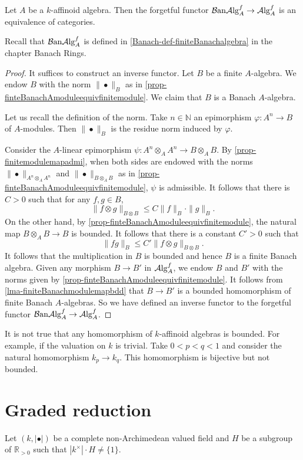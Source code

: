 \begin{proposition}
    Let $A$ be a $k$-affinoid algebra. Then the forgetful functor $\mathcal{B}\mathrm{an}\mathcal{A}\mathrm{lg}_A^f\rightarrow \mathcal{A}\mathrm{lg}_A^f$ is an equivalence of categories.
\end{proposition}
Recall that $\mathcal{B}\mathrm{an}\mathcal{A}\mathrm{lg}_A^f$ is defined in \cref{Banach-def-finiteBanachalgebra} in the chapter Banach Rings.
\begin{proof}
    It suffices to construct an inverse functor. Let $B$ be a finite $A$-algebra. 
    We endow $B$ with the norm $\|\bullet\|_B$ as in \cref{prop-finteBanachAmoduleequivfinitemodule}. We claim that $B$ is a Banach $A$-algebra.

    Let us recall the definition of the norm.
    Take $n\in \mathbb{N}$ an epimorphism $\varphi:A^n\rightarrow B$ of $A$-modules. Then $\|\bullet\|_B$ is the residue norm induced by $\varphi$.

    Consider the $A$-linear epimorphism $\psi:A^n\otimes_A A^n\rightarrow B\otimes_A B$. By \cref{prop-finitemodulemapadmi}, when both sides are endowed with the norms $\|\bullet\|_{A^n\otimes_A A^n}$ and $\|\bullet\|_{B\otimes_A B}$ as in \cref{prop-finteBanachAmoduleequivfinitemodule}, $\psi$ is admissible. It follows that there is $C>0$ such that for any $f,g\in B$,
    \[
        \|f\otimes g\|_{B\otimes B}\leq C\|f\|_B \cdot\|g\|_B.  
    \]
    On the other hand, by \cref{prop-finteBanachAmoduleequivfinitemodule}, the natural map $B\otimes_A B\rightarrow B$ is bounded. It follows that there is a constant $C'>0$ such that
    \[
        \|fg\|_B\leq C'\|f\otimes g\|_{B\otimes B}.
    \]
    It follows that the multiplication in $B$ is bounded and hence $B$ is a finite Banach algebra. Given any morphism $B\rightarrow B'$ in $\mathcal{A}\mathrm{lg}_A^f$, we endow $B$ and $B'$ with the norms given by \cref{prop-finteBanachAmoduleequivfinitemodule}. It follows from \cref{lma-finiteBanachmodulemapbdd} that $B\rightarrow B'$ is a bounded homomorphism of finite Banach $A$-algebras. So we have defined an inverse functor to the forgetful functor $\mathcal{B}\mathrm{an}\mathcal{A}\mathrm{lg}_A^f\rightarrow \mathcal{A}\mathrm{lg}_A^f$.
\end{proof}
\begin{remark}
    It is not true that any homomorphism of $k$-affinoid algebras is bounded. For example, if the valuation on $k$ is trivial. Take $0<p<q<1$ and consider the natural homomorphism $k_p\rightarrow k_q$. This homomorphism is bijective but not bounded.
\end{remark}


\section{Graded reduction}
Let $(k,|\bullet|)$ be a complete non-Archimedean valued field and $H$ be a subgroup of $\mathbb{R}_{>0}$ such that $|k^{\times}|\cdot H\neq \{1\}$.

